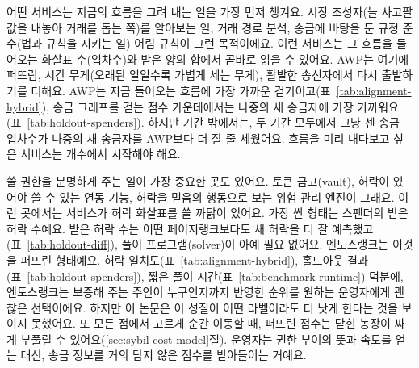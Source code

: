 
어떤 서비스는 지금의 흐름을 그려 내는 일을 가장 먼저 챙겨요. 시장 조성자(늘 사고팔 값을 내놓아 거래를 돕는 쪽)를 알아보는 일, 거래 경로 분석, 송금에 바탕을 둔 규정 준수(법과 규칙을 지키는 일) 어림 규칙이 그런 목적이에요. 이런 서비스는 그 흐름을 들어오는 화살표 수(입차수)와 받은 양의 합에서 곧바로 읽을 수 있어요. AWP는 여기에 퍼뜨림, 시간 무게(오래된 일일수록 가볍게 세는 무게), 활발한 송신자에서 다시 출발하기를 더해요. AWP는 지금 들어오는 흐름에 가장 가까운 걷기이고(표~\ref{tab:alignment-hybrid}), 송금 그래프를 걷는 점수 가운데에서는 나중의 새 송금자에 가장 가까워요(표~\ref{tab:holdout-spenders}). 하지만 기간 밖에서는, 두 기간 모두에서 그냥 센 송금 입차수가 나중의 새 송금자를 AWP보다 더 잘 줄 세웠어요. 흐름을 미리 내다보고 싶은 서비스는 개수에서 시작해야 해요.


쓸 권한을 분명하게 주는 일이 가장 중요한 곳도 있어요. 토큰 금고(vault), 허락이 있어야 쓸 수 있는 연동 기능, 허락을 믿음의 행동으로 보는 위험 관리 엔진이 그래요. 이런 곳에서는 서비스가 허락 화살표를 쓸 까닭이 있어요. 가장 싼 형태는 스펜더의 받은 허락 수예요. 받은 허락 수는 어떤 페이지랭크보다도 새 허락을 더 잘 예측했고(표~\ref{tab:holdout-diff}), 풀이 프로그램(solver)이 아예 필요 없어요. 엔도스랭크는 이것을 퍼뜨린 형태예요. 허락 일치도(표~\ref{tab:alignment-hybrid}), 홀드아웃 결과(표~\ref{tab:holdout-spenders}), 짧은 풀이 시간(표~\ref{tab:benchmark-runtime}) 덕분에, 엔도스랭크는 보증해 주는 주인이 누구인지까지 반영한 순위를 원하는 운영자에게 괜찮은 선택이에요. 하지만 이 논문은 이 성질이 어떤 라벨이라도 더 낫게 한다는 것을 보이지 못했어요. 또 모든 점에서 고르게 순간 이동할 때, 퍼뜨린 점수는 닫힌 농장이 싸게 부풀릴 수 있어요(\ref{sec:sybil-cost-model}절). 운영자는 권한 부여의 뜻과 속도를 얻는 대신, 송금 정보를 거의 담지 않은 점수를 받아들이는 거예요.


